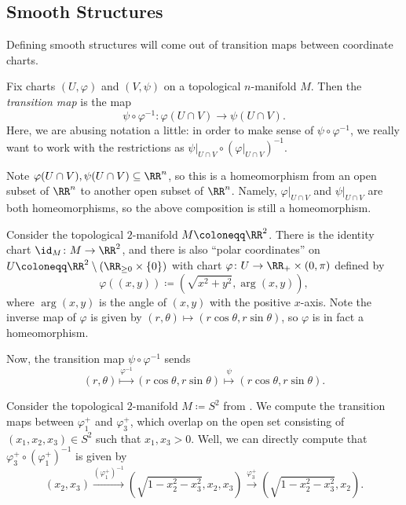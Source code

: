 \documentclass[../notes.tex]{subfiles}
\begin{document}
\subsection{Smooth Structures}
Defining smooth structures will come out of transition maps between coordinate charts.
\begin{definition}
	Fix charts $(U,\varphi)$ and $(V,\psi)$ on a topological $n$-manifold $M$. Then the \textit{transition map} is the map
	\[\psi\circ\varphi^{-1}\colon\varphi(U\cap V)\to\psi(U\cap V).\]
	Here, we are abusing notation a little: in order to make sense of $\psi\circ\varphi^{-1}$, we really want to work with the restrictions as $\psi|_{U\cap V}\circ(\varphi|_{U\cap V})^{-1}$.
\end{definition}
\begin{remark}
	Note $\varphi(U\cap V),\psi(U\cap V)\subseteq\RR^n$, so this is a homeomorphism from an open subset of $\RR^n$ to another open subset of $\RR^n$. Namely, $\varphi|_{U\cap V}$ and $\psi|_{U\cap V}$ are both homeomorphisms, so the above composition is still a homeomorphism.
\end{remark}
\begin{example}
	Consider the topological $2$-manifold $M\coloneqq\RR^2$. There is the identity chart $\id_M\colon M\to\RR^2$, and there is also ``polar coordinates'' on $U\coloneqq\RR^2\setminus(\RR_{\ge0}\times\{0\})$ with chart $\varphi\colon U\to\RR_+\times(0,\pi)$ defined by
	\[\varphi((x,y))\coloneqq\left(\sqrt{x^2+y^2},\arg(x,y)\right),\]
	where $\arg(x,y)$ is the angle of $(x,y)$ with the positive $x$-axis. Note the inverse map of $\varphi$ is given by $(r,\theta)\mapsto(r\cos\theta,r\sin\theta)$, so $\varphi$ is in fact a homeomorphism.

	Now, the transition map $\psi\circ\varphi^{-1}$ sends
	\[(r,\theta)\stackrel{\varphi^{-1}}\mapsto(r\cos\theta,r\sin\theta)\stackrel\psi\mapsto(r\cos\theta,r\sin\theta).\]
\end{example}
\begin{example}
	Consider the topological $2$-manifold $M\coloneqq S^2$ from . We compute the transition maps between $\varphi_1^+$ and $\varphi_3^+$, which overlap on the open set consisting of $(x_1,x_2,x_3)\in S^2$ such that $x_1,x_3>0$. Well, we can directly compute that $\varphi_3^+\circ\left(\varphi_1^+\right)^{-1}$ is given by
	\[(x_2,x_3)\stackrel{(\varphi_1^+)^{-1}}\to\left(\sqrt{1-x_2^2-x_3^2},x_2,x_3\right)\stackrel{\varphi_3^+}\to\left(\sqrt{1-x_2^2-x_3^2},x_2\right).\]
\end{example}
\end{document}
